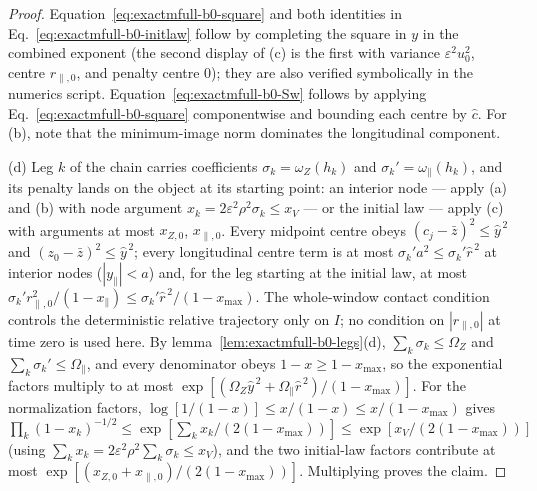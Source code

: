 \begin{proof}
Equation~\eqref{eq:exactmfull-b0-square} and both identities in
Eq.~\eqref{eq:exactmfull-b0-initlaw} follow by completing the square in
\(y\) in the combined exponent (the second display of (c) is the first with
variance \(\varepsilon^2u_0^2\), centre \(r_{\parallel,0}\), and penalty
centre \(0\)); they are also verified symbolically in the numerics script.
Equation~\eqref{eq:exactmfull-b0-Sw} follows by applying
Eq.~\eqref{eq:exactmfull-b0-square} componentwise and bounding each centre
by \(\hat c\).  For (b), note that the minimum-image norm dominates the
longitudinal component.

(d)  Leg \(k\) of the chain carries coefficients
\(\sigma_k=\omega_Z(h_k)\) and \(\sigma_k'=\omega_\parallel(h_k)\), and its
penalty lands on the object at its starting point: an interior node ---
apply (a) and (b) with node argument
\(x_k=2\varepsilon^2\rho^2\sigma_k\le x_V\) --- or the initial law ---
apply (c) with arguments at most \(x_{Z,0}\), \(x_{\parallel,0}\).  Every
midpoint centre obeys \((c_j-\bar z)^2\le\hat y^{\,2}\) and
 \((z_0-\bar z)^2\le\hat y^{\,2}\); every longitudinal centre term is at
 most \(\sigma_k'a^2\le\sigma_k'\hat r^{\,2}\) at interior nodes
 (\(|y_\parallel|<a\)) and, for the leg starting at the initial law, at most
 \(\sigma_k'r_{\parallel,0}^2/(1-x_\parallel)
 \le\sigma_k'\hat r^{\,2}/(1-x_{\max})\).
 The whole-window contact condition controls the deterministic relative
 trajectory only on \(I\); no condition on \(|r_{\parallel,0}|\) at time zero
 is used here.  By
lemma~\ref{lem:exactmfull-b0-legs}(d),
\(\sum_k\sigma_k\le\Omega_Z\) and
\(\sum_k\sigma_k'\le\Omega_\parallel\), and every denominator obeys
\(1-x\ge1-x_{\max}\), so the exponential factors multiply to at most
 \(\exp[(\Omega_Z\hat y^{\,2}+\Omega_\parallel\hat r^{\,2})/(1-x_{\max})]\).  For
the normalization factors, \(\log[1/(1-x)]\le x/(1-x)\le x/(1-x_{\max})\)
gives
\(\prod_k(1-x_k)^{-1/2}
\le\exp[\sum_kx_k/(2(1-x_{\max}))]
\le\exp[x_V/(2(1-x_{\max}))]\)
(using \(\sum_kx_k=2\varepsilon^2\rho^2\sum_k\sigma_k\le x_V\)), and the
two initial-law factors contribute at most
\(\exp[(x_{Z,0}+x_{\parallel,0})/(2(1-x_{\max}))]\).  Multiplying proves
the claim.
\end{proof}

